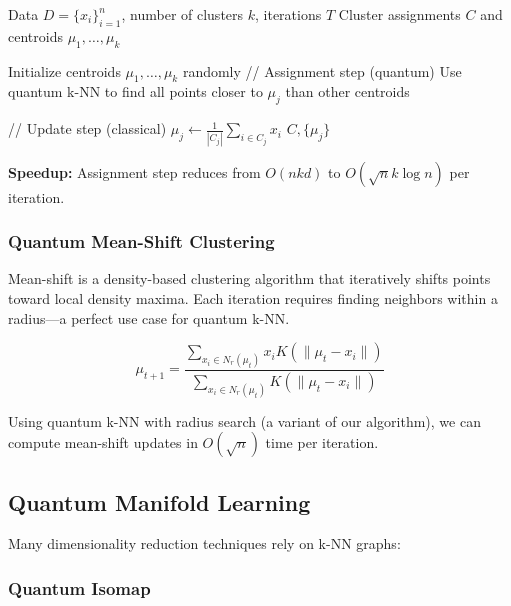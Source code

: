 \documentclass[11pt]{article}
\begin{document}
\begin{algorithm}
\caption{Quantum k-Means}
\begin{algorithmic}[1]
\REQUIRE Data $D = \{x_i\}_{i=1}^n$, number of clusters $k$, iterations $T$
\ENSURE Cluster assignments $C$ and centroids $\mu_1, \ldots, \mu_k$

\STATE Initialize centroids $\mu_1, \ldots, \mu_k$ randomly
    \STATE // Assignment step (quantum)
        \STATE Use quantum k-NN to find all points closer to $\mu_j$ than other centroids
    \ENDFOR
    
    \STATE // Update step (classical)
        \STATE $\mu_j \leftarrow \frac{1}{|C_j|} \sum_{i \in C_j} x_i$
    \ENDFOR
\ENDFOR
\RETURN $C, \{\mu_j\}$
\end{algorithmic}
\end{algorithm}

\textbf{Speedup:} Assignment step reduces from $O(nkd)$ to $O(\sqrt{n}k \log n)$ per iteration.

\subsubsection{Quantum Mean-Shift Clustering}

Mean-shift is a density-based clustering algorithm that iteratively shifts points toward local density maxima. Each iteration requires finding neighbors within a radius---a perfect use case for quantum k-NN.

\begin{equation}
\mu_{t+1} = \frac{\sum_{x_i \in N_r(\mu_t)} x_i K(\|\mu_t - x_i\|)}{\sum_{x_i \in N_r(\mu_t)} K(\|\mu_t - x_i\|)}
\end{equation}

Using quantum k-NN with radius search (a variant of our algorithm), we can compute mean-shift updates in $O(\sqrt{n})$ time per iteration.

\subsection{Quantum Manifold Learning}

Many dimensionality reduction techniques rely on k-NN graphs:

\subsubsection{Quantum Isomap}
\end{document}
